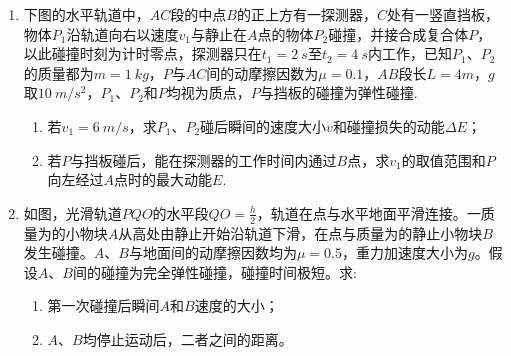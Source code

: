 \begin{enumerate}[leftmargin=0em]
\item 
{}
下图的水平轨道中，$ AC $段的中点$ B $的正上方有一探测器，$ C $处有一竖直挡板，物体$ P_{1} $沿轨道向右以速度$ v_{1} $与静止在$ A $点的物体$ P_{2} $碰撞，并接合成复合体$ P $，以此碰撞时刻为计时零点，探测器只在$ t_{1} =2\ s $至$ t_{2} =4\ s $内工作，已知$ P_{1} $、$ P_{2} $的质量都为$ m=1 \ kg $，$ P $与$ AC $间的动摩擦因数为$ \mu =0.1 $，$ AB $段长$ L=4m $，$ g $取$ 10 \ m/s^{2} $，$ P_{1} $、$ P_{2} $和$ P $均视为质点，$ P $与挡板的碰撞为弹性碰撞.
\begin{enumerate}
\renewcommand{\labelenumi}{\arabic{enumi}.}
\item
若$ v_{1} =6 \ m/s $，求$ P_{1} $、$ P_{2} $碰后瞬间的速度大小$ v $和碰撞损失的动能$ \Delta E $；
\item 
若$ P $与挡板碰后，能在探测器的工作时间内通过$ B $点，求$ v_{1} $的取值范围和$ P $向左经过$ A $点时的最大动能$ E $.

\end{enumerate}
\begin{figure}[h!]
\flushright

\end{figure}





\newpage	
\item 
{}
如图，光滑轨道$ PQO $的水平段$ QO=\frac{h}{2} $，轨道在点与水平地面平滑连接。一质量为的小物块$ A $从高处由静止开始沿轨道下滑，在点与质量为的静止小物块$ B $发生碰撞。$ A $、$ B $与地面间的动摩擦因数均为$ \mu=0.5 $，重力加速度大小为$ g $。假设$ A $、$ B $间的碰撞为完全弹性碰撞，碰撞时间极短。求:
\begin{enumerate}
\renewcommand{\labelenumi}{\arabic{enumi}.}
\item
第一次碰撞后瞬间$ A $和$ B $速度的大小；
\item 
$ A $、$ B $均停止运动后，二者之间的距离。


\end{enumerate}
\end{enumerate}
